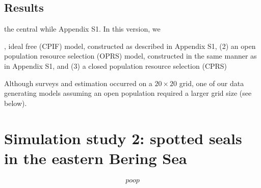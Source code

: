 \documentclass[12pt,fleqn]{article}
\begin{document}
\begin{flushleft}
\subsection{Results}






the central while   Appendix S1.  In this version, we

, ideal free (CPIF) model, constructed as described in Appendix S1, (2) an open population resource selection (OPRS) model, constructed in the same manner as in Appendix S1, and (3) a closed population resource selection (CPRS)



\hspace{.5in} Although surveys and estimation occurred on a $20 \times 20$ grid, one of our data generating models assuming an open population required a larger grid size (see below).



\section{Simulation study 2: spotted seals in the eastern Bering Sea}


\begin{linenomath*}
\begin{eqnarray}
  poop \nonumber
\end{eqnarray}
\end{linenomath*}




\renewcommand{\refname}{Literature Cited}




\end{flushleft}
\end{document}
